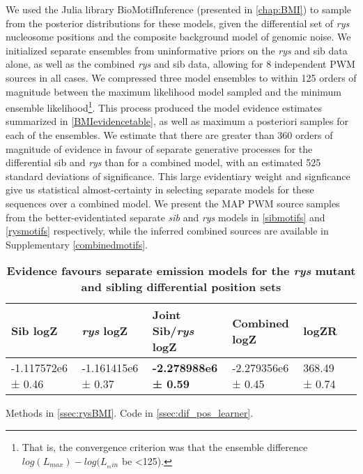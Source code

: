 We used the Julia library BioMotifInference (presented in \autoref{chap:BMI}) to sample from the posterior distributions for these models, given the differential set of \textit{rys} nucleosome positions and the composite background model of genomic noise. We initialized separate ensembles from uninformative priors on the \textit{rys} and sib data alone, as well as the combined \textit{rys} and sib data, allowing for 8 independent PWM sources in all cases. We compressed three model ensembles to within 125 orders of magnitude between the maximum likelihood model sampled and the minimum ensemble likelihood\footnote{That is, the convergence criterion was that the ensemble difference $log(L_{max})-log(L_{_min}$ be <125).}. This process produced the model evidence estimates summarized in \autoref{BMIevidencetable}, as well as maximum a posteriori samples for each of the ensembles. We estimate that there are greater than 360 orders of magnitude of evidence in favour of separate generative processes for the differential sib and \textit{rys} than for a combined model, with an estimated 525 standard deviations of significance. This large evidentiary weight and signficance give us statistical almost-certainty in selecting separate models for these sequences over a combined model. We present the MAP PWM source samples from the better-evidentiated separate \textit{sib} and \textit{rys} models in \autoref{sibmotifs} and \autoref{rysmotifs} respectively, while the inferred combined sources are available in Supplementary \autoref{combinedmotifs}.

\begin{table}[!ht]
    \centering
    \caption{{\bf Evidence favours separate emission models for the \textit{rys} mutant and sibling differential position sets}}
    \begin{tabular}{|l|l|l|l|l|l|}
        \hline {\bf Sib logZ} & {\bf \textit{rys} logZ} & {\bf Joint Sib/\textit{rys} logZ} & {\bf Combined logZ} & {\bf logZR} \\ \hline
        -1.117572e6 ± 0.46 & -1.161415e6 ± 0.37 & {\bf -2.278988e6 ± 0.59} & -2.279356e6 ± 0.45 &  368.49 ± 0.74 \\ \hline
        \end{tabular}
    \begin{flushleft}
        Methods in \autoref{ssec:rysBMI}.
        Code in \autoref{ssec:dif_pos_learner}.
    \end{flushleft}
    \label{BMIevidencetable}
\end{table}

